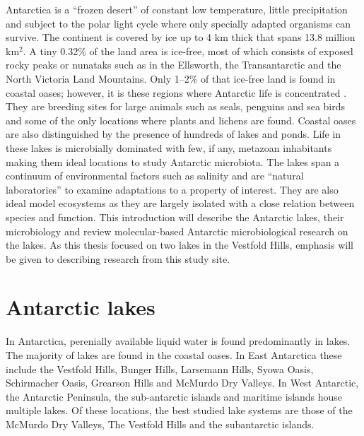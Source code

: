 Antarctica is a ``frozen desert'' of constant low temperature, little precipitation and subject to the polar light cycle where only specially adapted organisms can survive.
The continent is covered by ice up to 4 km thick that spans 13.8 million km$^2$.
A tiny 0.32\% of the land area is ice-free, most of which consists of exposed rocky peaks or nunataks such as in the Ellsworth, the Transantarctic and the North Victoria Land Mountains. %
Only 1--2\% of that ice-free land is found in coastal oases; however, it is these regions where Antarctic life is concentrated \cite{Hodgson2012}.
They are breeding sites for large animals such as seals, penguins and sea birds and some of the only locations where plants and lichens are found.
Coastal oases are also distinguished by the presence of hundreds of lakes and ponds.
Life in these lakes is microbially dominated with few, if any, metazoan inhabitants \cite{Laybourn-Parry1997} making them ideal locations to study Antarctic microbiota. 
The lakes span a continuum of environmental factors such as salinity and are ``natural laboratories'' to examine adaptations to a property of interest. 
They are also ideal model ecosystems as they are largely isolated with a close relation between species and function.
This introduction will describe the Antarctic lakes, their microbiology and review molecular-based Antarctic microbiological research on the lakes.
As this thesis focused on two lakes in the Vestfold Hills, emphasis will be given to describing research from this study site.


\section{Antarctic lakes}
In Antarctica, perenially available liquid water is found predominantly in lakes. 
The majority of lakes are found in the coastal oases. %
In East Antarctica these include the Vestfold Hills, Bunger Hills, Larsemann Hills, Syowa Oasis, Schirmacher Oasis, Grearson Hills and McMurdo Dry Valleys.
In West Antarctic, the Antarctic Peninsula, the sub-antarctic islands and maritime islands house multiple lakes. 
Of these locations, the best studied lake systems are those of the McMurdo Dry Valleys, The Vestfold Hills and the subantarctic islands.

